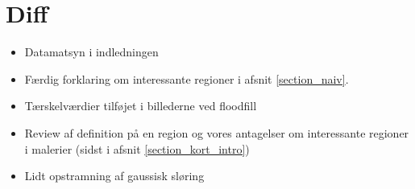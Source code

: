 {
\section*{Diff}
\begin{itemize}
    \item Datamatsyn i indledningen
    \item Færdig forklaring om interessante regioner i afsnit
        \ref{section_naiv}.
    \item Tærskelværdier tilføjet i billederne ved floodfill
    \item Review af definition på en region og vores antagelser om
        interessante regioner i malerier (sidst i afsnit
        \ref{section_kort_intro})
    \item Lidt opstramning af gaussisk sløring
\end{itemize}
}

